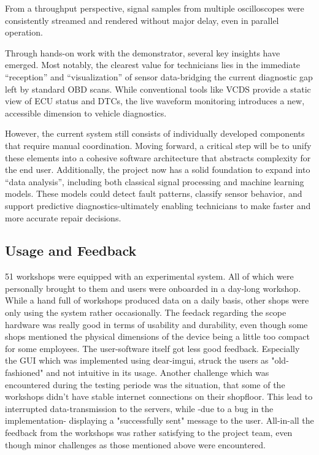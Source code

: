 From a throughput perspective, signal samples from multiple oscilloscopes were consistently streamed and rendered without major delay, even in parallel operation. 

Through hands-on work with the demonstrator, several key insights have emerged. 
Most notably, the clearest value for technicians lies in the immediate ``reception'' and ``visualization'' of sensor data-bridging the current diagnostic gap left by standard OBD scans. 
While conventional tools like VCDS provide a static view of ECU status and DTCs, the live waveform monitoring introduces a new, accessible dimension to vehicle diagnostics.

However, the current system still consists of individually developed components that require manual coordination. 
Moving forward, a critical step will be to unify these elements into a cohesive software architecture that abstracts complexity for the end user. 
Additionally, the project now has a solid foundation to expand into ``data analysis'', including both classical signal processing and machine learning models. 
These models could detect fault patterns, classify sensor behavior, and support predictive diagnostics-ultimately enabling technicians to make faster and more accurate repair decisions.



\subsection{Usage and Feedback}
51 workshops were equipped with an experimental system.
All of which were personally brought to them and users were onboarded in a day-long workshop.
While a hand full of workshops produced data on a daily basis, other shops were only using the system rather occasionally. 
The feedack regarding the scope hardware was really good in terms of usability and durability, even though some shops mentioned the physical dimensions of the device being a little too compact for some employees.
The user-software itself got less good feedback. 
Especially the GUI which was implemented using dear-imgui, struck the users as "old-fashioned" and not intuitive in its usage.
Another challenge which was encountered during the testing periode was the situation, that some of the workshops didn't have stable internet connections on their shopfloor.
This lead to interrupted data-transmission to the servers, while -due to a bug in the implementation- displaying a "successfully sent" message to the user.
All-in-all the feedback from the workshops was rather satisfying to the project team, even though minor challenges as those mentioned above were encountered.

